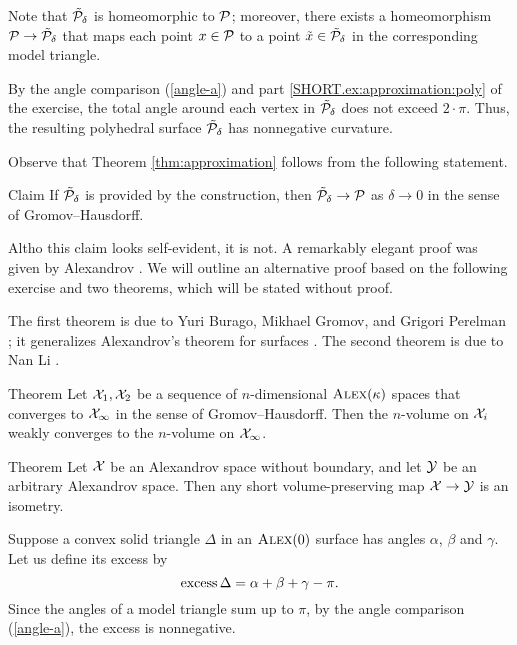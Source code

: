 Note that $\tilde{\mathcal{P}}_\delta$ is homeomorphic to $\mathcal{P}$;
moreover, there exists a homeomorphism $\mathcal{P} \to \tilde{\mathcal{P}}_\delta$ that maps each point $x \in \mathcal{P}$ to a point $\tilde{x} \in \tilde{\mathcal{P}}_\delta$ in the corresponding model triangle.

By the angle comparison (\ref{angle-a}) and part \ref{SHORT.ex:approximation:poly} of the exercise, the total angle around each vertex in $\tilde{\mathcal{P}}_\delta$ does not exceed $2\cdot\pi$.
Thus, the resulting polyhedral surface $\tilde{\mathcal{P}}_\delta$ has nonnegative curvature.
\qeds

Observe that Theorem \ref{thm:approximation} follows from the following statement.

\begin{thm}{Claim}\label{clm:approximation}
If $\tilde{\mathcal{P}}_\delta$ is provided by the construction, then $\tilde{\mathcal{P}}_\delta\to\mathcal{P}$ as $\delta\to 0$ in the sense of Gromov--Hausdorff.
\end{thm}

Altho this claim looks self-evident, it is not.
A remarkably elegant proof was given by Alexandrov \cite[VII §~6]{alexandrov-1948}.
We will outline an alternative proof based on the following exercise and two theorems, which will be stated without proof.

The first theorem is due to Yuri Burago, Mikhael Gromov, and Grigori Perelman \cite[10.8]{burago-gromov-perelman};
it generalizes Alexandrov's theorem for surfaces \cite[X §~2]{alexandrov-1948}.
The second theorem is due to Nan Li \cite{li}.

\begin{thm}{Theorem}\label{thm:cont-vol}
Let $\mathcal{X}_1, \mathcal{X}_2$ be a sequence of $n$-dimensional $\textsc{Alex}(\kappa)$ spaces that converges to $\mathcal{X}_\infty$ in the sense of Gromov--Hausdorff.
Then the $n$-volume on $\mathcal{X}_i$ weakly converges to the $n$-volume on $\mathcal{X}_\infty$.
\end{thm}

\begin{thm}{Theorem}\label{thm:vol-short}
Let $\mathcal{X}$ be an Alexandrov space without boundary, and let $\mathcal{Y}$ be an arbitrary Alexandrov space.
Then any short volume-preserving map $\mathcal{X}\to\mathcal{Y}$ is an isometry.
\end{thm}

Suppose a convex solid triangle $\Delta$ in an $\textsc{Alex}(0)$ surface has angles $\alpha$, $\beta$ and $\gamma$.
Let us define its excess by
\[\operatorname{\rm excess}\nolimits\Delta=\alpha+\beta+\gamma-\pi.\]
Since the angles of a model triangle sum up to $\pi$, by the angle comparison (\ref{angle-a}),
the excess is nonnegative.

